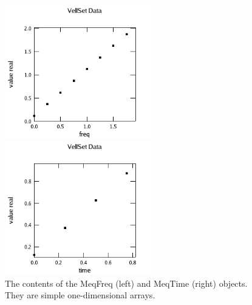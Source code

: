 \documentclass[10pt]{article}
\begin{document}
\begin{figure}
  \centering
  \begin{minipage}[c]{0.5\textwidth}
     \centering \includegraphics[width=2.5in]{FiguresAndDiagrams/freq}
  \end{minipage}%
  \begin{minipage}[c]{0.5\textwidth}
     \centering \includegraphics[width=2.5in]{FiguresAndDiagrams/time}
  \end{minipage}
  \caption {The contents of the MeqFreq (left) and MeqTime (right) objects.
  They are simple one-dimensional arrays.} 
  \label{fig:freq}
\end{figure}
\end{document}
